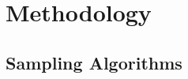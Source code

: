 \section{Methodology}\label{sec:Method}

\subsection{Sampling Algorithms}\label{sec:sampling_algos}

